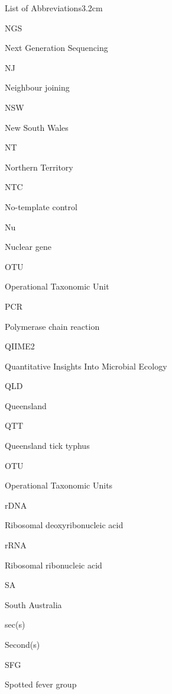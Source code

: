 \documentclass[a4paper, nobind]{templates/ociamthesis}
\begin{document}
\begin{romanpages}
\begin{mclistof}{List of Abbreviations}{3.2cm}
\item[NGS]

Next Generation Sequencing

\item[NJ]

Neighbour joining

\item[NSW]

New South Wales

\item[NT]

Northern Territory

\item[NTC]

No-template control

\item[Nu]

Nuclear gene

\item[OTU]

Operational Taxonomic Unit

\item[PCR]

Polymerase chain reaction

\item[QIIME2]

Quantitative Insights Into Microbial Ecology

\item[QLD]

Queensland

\item[QTT]

Queensland tick typhus

\item[OTU]

Operational Taxonomic Units

\item[rDNA]

Ribosomal deoxyribonucleic acid

\item[rRNA]

Ribosomal ribonucleic acid

\item[SA]

South Australia

\item[sec(s)]

Second(s)

\item[SFG]

Spotted fever group


\end{mclistof}
\end{romanpages}
\end{document}

